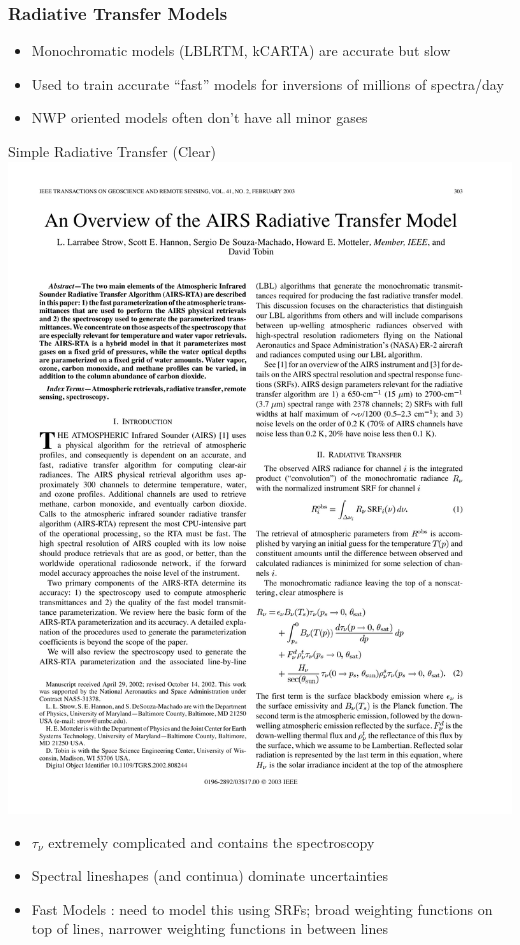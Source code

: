\documentclass[10pt,t]{beamer}
\begin{document}
\begin{frame}
  \frametitle{Radiative Transfer Models}
  \begin{itemize}
  \item Monochromatic models (LBLRTM, kCARTA) are accurate but slow
  \item Used to train accurate ``fast'' models for inversions of millions of spectra/day
  \item NWP oriented models often don't have all minor gases
  \end{itemize}
  \begin{block}{Simple Radiative Transfer (Clear)}
    \centering \includegraphics[width=0.55\linewidth]{Figslls/simple_rta.pdf}
   \begin{small}
    \begin{itemize}
    \item $\tau_{\nu}$ extremely complicated and contains the spectroscopy
    \item Spectral lineshapes (and continua) dominate uncertainties
    \item Fast Models : need to model this using SRFs; broad weighting functions on top of lines, narrower weighting functions in between lines
    \end{itemize}
 \end{small}
  \end{block}
\end{frame}
\end{document}
